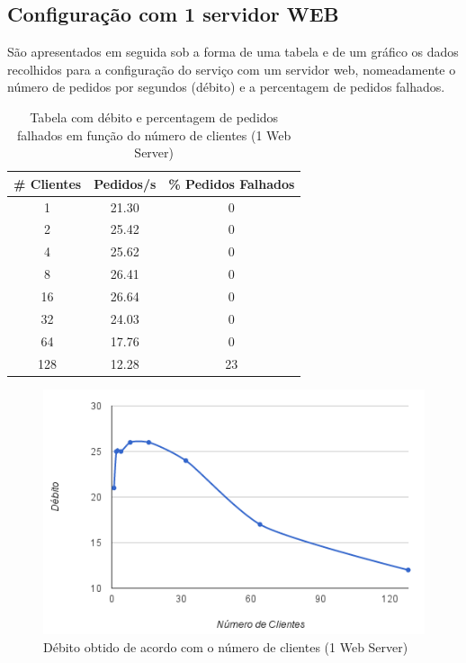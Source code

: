 \subsection{Configuração com 1 servidor WEB}


São apresentados em seguida sob a forma de uma tabela e de um gráfico os dados recolhidos para a configuração do serviço com um servidor web, nomeadamente o número de pedidos por segundos (débito) e a percentagem de pedidos falhados.

\begin{table}[!h]
\centering
\begin{tabular}{|c|c|c|}
\hline
\textbf{\# Clientes} & \textbf{Pedidos/s} & \textbf{\% Pedidos Falhados} \\ \hline
1 & 21.30 & 0 \\ \hline
2 & 25.42 & 0 \\ \hline
4 & 25.62 & 0 \\ \hline
8 & 26.41 & 0 \\ \hline
16 & 26.64 & 0 \\ \hline
32 & 24.03 & 0 \\ \hline
64 & 17.76 & 0 \\ \hline
128 & 12.28 & 23 \\ \hline
\end{tabular}
\caption{Tabela com débito e percentagem de pedidos falhados em função do número de clientes (1 Web Server)}
\end{table}

\begin{figure}[!h]
\centering
\includegraphics[scale=.6]{img/ab/web1.png}
\caption{Débito obtido de acordo com o número de clientes (1 Web Server)}
\end{figure}

